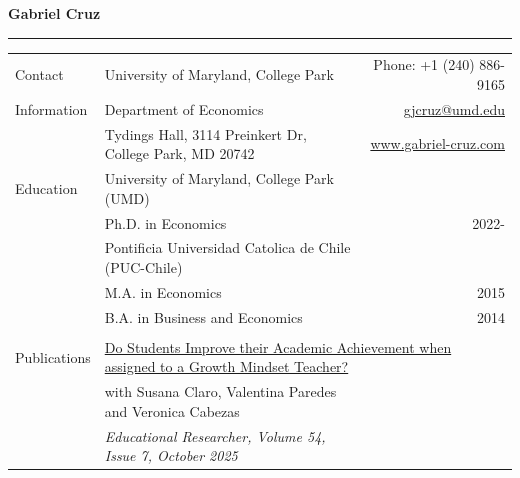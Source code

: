 \documentclass[letterpaper,11pt,oneside]{article}
\begin{document}

\Large{\textbf{Gabriel Cruz}} \\
\vspace{-2ex} 
\hrule 
\normalsize



\begin{tabular}{@{} l l r} \\
 \Large{Contact} & University of Maryland, College Park & Phone: +1 (240) 886-9165 \\
 \Large{Information} & Department of Economics   &  \href{gjcruz@umd.edu}{gjcruz@umd.edu}  \\
 & Tydings Hall, 3114 Preinkert Dr, College Park, MD 20742 & \href{https://gabrielcruzfer.github.io}{www.gabriel-cruz.com} \\ [0.6em]




 \Large{Education} & University of Maryland, College Park (UMD) & \\
     & Ph.D. in Economics &  2022-  \\ [0.5em]
  
     & Pontificia Universidad Catolica de Chile (PUC-Chile) & \\
     & M.A. in Economics & 2015 \\
     & B.A. in Business and Economics & 2014 \\ \\

 \Large{Publications}    & \multicolumn{2}{l}{ \href{https://journals.sagepub.com/doi/abs/10.3102/0013189X251333775}{Do Students Improve their Academic Achievement when assigned to a Growth Mindset Teacher?}}  \\
    & \parbox{4in}{with Susana Claro, Valentina Paredes and Veronica Cabezas}\\
    & \textit{Educational Researcher, Volume 54, Issue 7, October 2025} \\ [0.5em]


\end{tabular}
\end{document}
